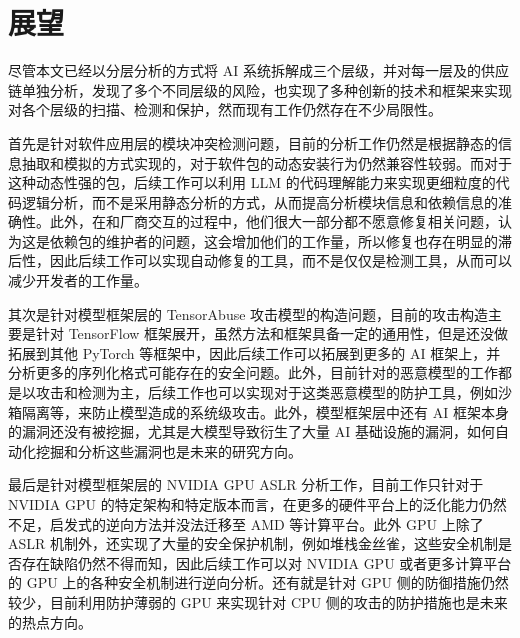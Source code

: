 \section{展望}
尽管本文已经以分层分析的方式将 AI 系统拆解成三个层级，并对每一层及的供应链单独分析，发现了多个不同层级的风险，也实现了多种创新的技术和框架来实现对各个层级的扫描、检测和保护，然而现有工作仍然存在不少局限性。

首先是针对软件应用层的模块冲突检测问题，目前的分析工作仍然是根据静态的信息抽取和模拟的方式实现的，对于软件包的动态安装行为仍然兼容性较弱。而对于这种动态性强的包，后续工作可以利用 LLM 的代码理解能力来实现更细粒度的代码逻辑分析，而不是采用静态分析的方式，从而提高分析模块信息和依赖信息的准确性。此外，在和厂商交互的过程中，他们很大一部分都不愿意修复相关问题，认为这是依赖包的维护者的问题，这会增加他们的工作量，所以修复也存在明显的滞后性，因此后续工作可以实现自动修复的工具，而不是仅仅是检测工具，从而可以减少开发者的工作量。

其次是针对模型框架层的 TensorAbuse 攻击模型的构造问题，目前的攻击构造主要是针对 TensorFlow 框架展开，虽然方法和框架具备一定的通用性，但是还没做拓展到其他 PyTorch 等框架中，因此后续工作可以拓展到更多的 AI 框架上，并分析更多的序列化格式可能存在的安全问题。此外，目前针对的恶意模型的工作都是以攻击和检测为主，后续工作也可以实现对于这类恶意模型的防护工具，例如沙箱隔离等，来防止模型造成的系统级攻击。此外，模型框架层中还有 AI 框架本身的漏洞还没有被挖掘，尤其是大模型导致衍生了大量 AI 基础设施的漏洞，如何自动化挖掘和分析这些漏洞也是未来的研究方向。

最后是针对模型框架层的 NVIDIA GPU ASLR 分析工作，目前工作只针对于 NVIDIA GPU 的特定架构和特定版本而言，在更多的硬件平台上的泛化能力仍然不足，启发式的逆向方法并没法迁移至 AMD 等计算平台。此外 GPU 上除了 ASLR 机制外，还实现了大量的安全保护机制，例如堆栈金丝雀，这些安全机制是否存在缺陷仍然不得而知，因此后续工作可以对 NVIDIA GPU 或者更多计算平台的 GPU 上的各种安全机制进行逆向分析。还有就是针对 GPU 侧的防御措施仍然较少，目前利用防护薄弱的 GPU 来实现针对 CPU 侧的攻击的防护措施也是未来的热点方向。